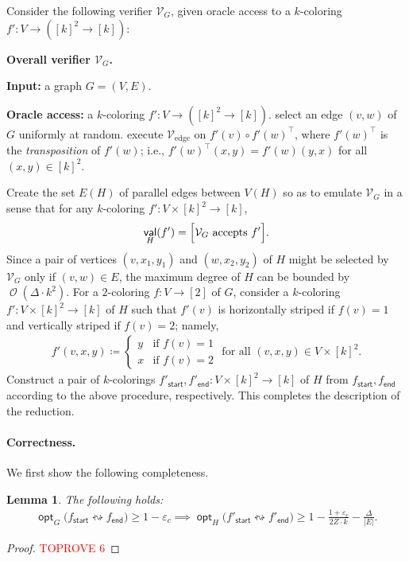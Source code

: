 \documentclass[11pt,fleqn]{article}
\renewcommand{\geq}{\geqslant}
\renewcommand{\epsilon}{\varepsilon}
\renewcommand{\top}{\intercal}
\newcommand{\reco}{\leftrightsquigarrow}
\newcommand{\defeq}{\coloneq}
\DeclareMathOperator{\bigO}{\mathcal{O}}
\DeclareMathOperator{\val}{\mathsf{val}}
\DeclareMathOperator{\opt}{\mathsf{opt}}
\newcommand{\sss}{\mathsf{start}}
\newcommand{\ttt}{\mathsf{end}}
\newcommand{\V}{\calV}
\newcommand{\f}{f}
\newcommand{\Vedge}{\V_\mathrm{edge}}
\newcommand{\calV}{\mathcal{V}}
\let\Pr\relax\DeclareMathOperator*{\Pr}{\mathbb{P}}
\newtheorem{lemma}[theorem]{Lemma}
\theoremstyle{definition}
\numberwithin{equation}{section}
\begin{document}
Consider the following verifier $\V_G$,
given oracle access to a $k$-coloring $\f' \colon V \to ([k]^2 \to [k])$:
\begin{itembox}[l]{\textbf{Overall verifier $\V_G$.}}
\begin{algorithmic}[1]
    \item[\textbf{Input:}]
        a graph $G = (V,E)$.
    \item[\textbf{Oracle access:}]
        a $k$-coloring $\f' \colon V \to ([k]^2 \to [k])$.
    \State select an edge $(v,w)$ of $G$ uniformly at random.
    \State execute $\Vedge$ on $\f'(v) \circ \f'(w)^\top$,
    where $\f'(w)^\top$ is the \emph{transposition} of $\f'(w)$; i.e.,
    $\f'(w)^\top(x,y) = \f'(w)(y,x)$ for all $(x,y) \in [k]^2$.
\end{algorithmic}
\end{itembox}
Create the set $E(H)$ of parallel edges between $V(H)$ so as to emulate $\V_G$ in a sense that 
for any $k$-coloring $\f' \colon V \times [k]^2 \to [k]$,
\begin{align}
    \val_H(\f') = \Pr\Bigl[ \V_G \text{ accepts } \f' \Bigr].
\end{align}
Since a pair of vertices $(v,x_1,y_1)$ and $(w,x_2,y_2)$ of $H$
might be selected by $\V_G$ only if
$(v,w) \in E$, 
the maximum degree of $H$ can be bounded by $\bigO(\Delta \cdot k^2)$.
For a $2$-coloring $\f \colon V \to [2]$ of $G$,
consider a $k$-coloring $\f' \colon V \times [k]^2 \to [k]$ of $H$ such that
$\f'(v)$ is horizontally striped if $\f(v)=1$ and
vertically striped if $\f(v)=2$; namely,
\begin{align}
    \f'(v,x,y) \defeq
    \begin{cases}
        y & \text{if } \f(v) = 1 \\
        x & \text{if } \f(v) = 2
    \end{cases}
    \text{ for all } (v,x,y) \in V \times [k]^2.
\end{align}
Construct a pair of $k$-colorings $\f'_\sss, \f'_\ttt \colon V \times [k]^2 \to [k]$ of $H$
from $\f_\sss, \f_\ttt$ according to the above procedure, respectively.
This completes the description of the reduction.


\paragraph{Correctness.}
We first show the following completeness.


\begin{lemma}
\label{lem:Cut-hard:complete}
    The following holds\textup{:}
    \begin{align}
        \opt_G\bigl(\f_\sss \reco \f_\ttt\bigr) \geq 1-\epsilon_c
        \implies \opt_H\bigl(\f'_\sss \reco \f'_\ttt\bigr) \geq 1-\frac{1+\epsilon_c}{2Z \cdot k} - \frac{\Delta}{|E|}.
    \end{align}
\end{lemma}
\begin{proof}\textcolor{red}{TOPROVE 6}\end{proof}
\end{document}
